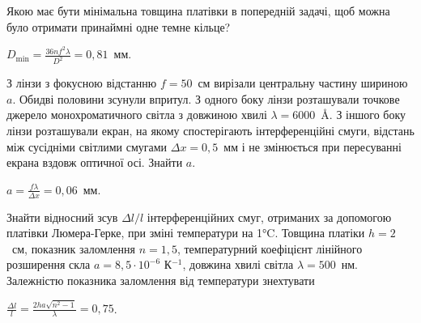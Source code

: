 \begin{problem}%
Якою має бути мінімальна товщина платівки в попередній задачі,
щоб можна було отримати принаймні одне темне кільце?
\begin{solution}
	$D_{\min} = \frac{36nf^2\lambda}{D^2} = 0,81$~мм.
\end{solution}
\end{problem}


\begin{problem}%
З лінзи з фокусною відстанню $ f = 50 $~см вирізали центральну частину
шириною $ a $. Обидві половини зсунули впритул. З одного боку лінзи
розташували точкове джерело монохроматичного світла з довжиною
хвилі $ \lambda =6000 $~\AA. З іншого боку лінзи розташували екран, на якому
спостерігають інтерференційні смуги, відстань між сусідніми світлими
смугами $ \Delta x = 0,5 $~мм і не змінюється при пересуванні екрана вздовж
оптичної осі. Знайти $a$.
\begin{solution}
	$a = \frac{f\lambda}{ \Delta x} = 0,06$~мм.
\end{solution}
\end{problem}



\begin{problem}%
Знайти відносний зсув $ \Delta l/ l $ інтерференційних смуг, отриманих за
допомогою платівки Люмера-Герке, при зміні температури на 1°C.
Товщина платіки $ h = 2 $~см, показник заломлення $ n = 1,5 $,
температурний коефіцієнт лінійного розширення скла $ a = 8,5\cdot10^{-6} $ К$^{-1}$,
довжина хвилі світла $ \lambda = 500 $~нм. Залежністю показника заломлення від
температури знехтувати
\begin{solution}
	$ \frac{\Delta l}{l}  = \frac{2ha\sqrt{n^2 - 1}}{\lambda} = 0,75$.
\end{solution}
\end{problem}



